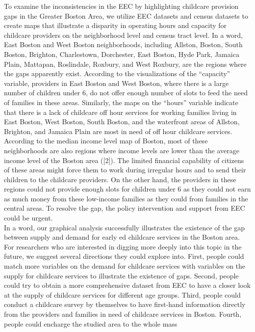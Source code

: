 \documentclass[10pt,letterpaper]{article}
\begin{document}
To examine the inconsistencies in the EEC by highlighting childcare
provision gaps in the Greater Boston Area, we utilize EEC datasets and
census datasets to create maps that illustrate a disparity in operating
hours and capacity for childcare providers on the neighborhood level and
census tract level. In a word, East Boston and West Boston
neighborhoods, including Allston, Boston, South Boston, Brighton,
Charlestown, Dorchester, East Boston, Hyde Park, Jamaica Plain,
Mattapan, Roslindale, Roxbury, and West Roxbury, are the regions where
the gaps apparently exist. According to the visualizations of the
``capacity'' variable, providers in East Boston and West Boston, where
there is a large number of children under 6, do not offer enough number
of slots to feed the need of families in these areas. Similarly, the
maps on the ``hours'' variable indicate that there is a lack of
childcare off hour services for working families living in East Boston,
West Boston, South Boston, and the waterfront areas of Allston,
Brighton, and Jamaica Plain are most in need of off hour childcare
services. According to the median income level map of Boston, most of
these neighborhoods are also regions where income levels are lower than
the average income level of the Boston area ({[}2{]}). The limited
financial capability of citizens of these areas might force them to work
during irregular hours and to send their children to the childcare
providers. On the other hand, the providers in these regions could not
provide enough slots for children under 6 as they could not earn as much
money from these low-income families as they could from families in the
central areas. To resolve the gap, the policy intervention and support
from EEC could be urgent.\\
In a word, our graphical analysis successfully illustrates the existence
of the gap between supply and demand for early ed childcare services in
the Boston area. For researchers who are interested in digging more
deeply into this topic in the future, we suggest several directions they
could explore into. First, people could match more variables on the
demand for childcare services with variables on the supply for childcare
services to illustrate the existence of gaps. Second, people could try
to obtain a more comprehensive dataset from EEC to have a closer look at
the supply of childcare services for different age groups. Third, people
could conduct a childcare survey by themselves to have first-hand
information directly from the providers and families in need of
childcare services in Boston. Fourth, people could encharge the studied
area to the whole mass
\end{document}
